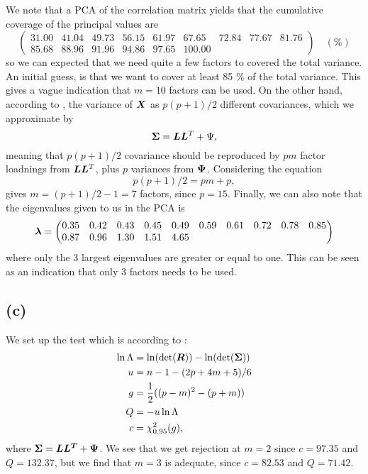 We note that a PCA of the correlation matrix yields that the cumulative
coverage of the principal values are 
\begin{equation*}
  \begin{pmatrix}
    31.00 &41.04 &49.73 &56.15 &61.97 &67.65 &72.84 &77.67 &81.76\\
    85.68 &88.96 &91.96 &94.86 &97.65 &100.00 
  \end{pmatrix}\quad (\%)
\end{equation*}
so we can expected that we need quite a few factors to covered the total
variance.  An initial guess, is that we want to cover at least 85 \% of
the total variance. This gives a vague indication that $m = 10$
factors can be used. On the other hand, according to
\cite[p. 485]{book}, the variance of $\bm{X}$ as $p(p+1)/2$ different
covariances, which we approximate by
\begin{equation*}
  \bm{\Sigma} = \bm{L} \bm{L}^{T} + \Psi,
\end{equation*}
meaning that $p(p+1)/2$ covariance should be reproduced by $pm$ factor
loadnings from $\bm{L} \bm{L}^{T}$, plus $p$ variances from $\bm{\Psi}$. Considering the equation 
\begin{equation*}
  p(p + 1)/2 = pm + p,
\end{equation*}
gives $m =(p + 1)/2 - 1 = 7 $ factors, since $p = 15$. Finally, we can
also note that the eigenvalues given to us in the PCA is
\begin{equation*}
  \bm{\lambda} =
  \begin{pmatrix}
    0.35 &0.42 &0.43 &0.45 &0.49 &0.59 &0.61 &0.72 &0.78 &0.85 \\ 0.87 &0.96 &1.30 &1.51 &4.65 
  \end{pmatrix}
\end{equation*}
where only the 3 largest eigenvalues are greater or equal to one. This
can be seen as an indication that only 3 factors needs to be used. 
\subsection*{(c)}
\label{sec:c-8}
 We set up the test which is
according to \cite[p. 502]{book}:
\begin{align*}
  \ln \Lambda &= \ln(\det(\bm{R})) - \ln(\det(\bm{\Sigma})) \\
  u &=  n - 1 -(2p+4m+5)/6 \\
  g &= \frac 12 ((p-m)^2 - (p+m)) \\
  Q &= -u \ln \Lambda \\
  c &=  \chi^2_{0.95}(g),
\end{align*}
where $\bm{\Sigma} = \bm{LL^T} + \bm{\Psi}$. We see that we get rejection at
$m = 2$ since $c = 97.35$ and $Q = 132.37$, but we find that $m = 3$
is adequate, since $c = 82.53$ and $Q = 71.42$. 
